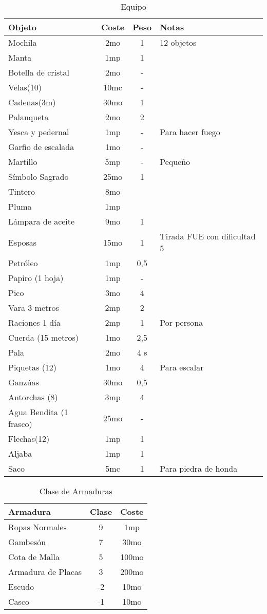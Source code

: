 \begin{multicols}{2}
\begin{table*}[p]
\centering
\caption{Equipo}
\begin{tabular}{lccp{5cm}}
\toprule
Objeto & Coste & Peso & Notas\\
\midrule
\midrule
Mochila&2mo&1 & 12 objetos\\
Manta&1mp&1 \\
Botella de cristal&2mo&-\\
Velas(10)&10mc&-\\
Cadenas(3m)&30mo&1 \\
Palanqueta&2mo&2 \\
Yesca y pedernal&1mp&-&Para hacer fuego\\
Garfio de escalada&1mo&-\\
Martillo&5mp&-& Pequeño\\
Símbolo Sagrado&25mo&1 \\
Tintero & 8mo & \\
Pluma & 1mp & \\
Lámpara de aceite & 9mo & 1 \\
Esposas & 15mo & 1 & Tirada FUE con dificultad 5 \\
Petróleo & 1mp & 0,5 \\
Papiro (1 hoja) & 1mp & -\\
Pico & 3mo & 4\\
Vara 3 metros & 2mp & 2\\
Raciones 1 día & 2mp & 1 & Por persona\\
Cuerda (15 metros) & 1mo & 2,5\\
Pala & 2mo & 4 s\\
Piquetas (12) & 1mo & 4 & Para escalar\\
Ganzúas & 30mo & 0,5\\
Antorchas (8) & 3mp & 4\\
Agua Bendita (1 frasco) & 25mo & -\\
Flechas(12) & 1mp & 1\\
Aljaba & 1mp & 1\\
Saco & 5mc & 1 & Para piedra de honda\\
\bottomrule
\end{tabular}
\end{table*}

\begin{table*}[p]
\centering
\begin{threeparttable}
\caption{Clase de Armaduras}
\begin{tabular}{lcc}

\toprule
Armadura  & Clase & Coste  \\
\midrule
\midrule
Ropas Normales & 9 & 1mp \\
Gambesón & 7 & 30mo \\
Cota de Malla & 5 & 100mo \\
Armadura de Placas & 3 & 200mo \\
Escudo & -2 & 10mo \\
Casco & -1 & 10mo \\
\bottomrule
\end{tabular}


\end{threeparttable}
\end{table*}
\end{multicols}
